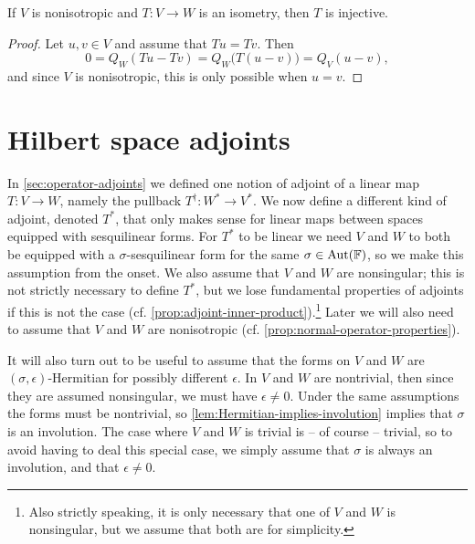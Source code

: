 \begin{lemma}
    \label{lem:isometry-injective}
    If $V$ is nonisotropic and $T \colon V \to W$ is an isometry, then $T$ is injective.
\end{lemma}

\begin{proof}
    Let $u,v \in V$ and assume that $Tu = Tv$. Then
    \begin{equation*}
        0
            = Q_W(Tu - Tv)
            = Q_W \bigl( T(u-v) \bigr)
            = Q_V(u-v),
    \end{equation*}
    and since $V$ is nonisotropic, this is only possible when $u = v$.
\end{proof}


\section{Hilbert space adjoints}

In \cref{sec:operator-adjoints} we defined one notion of adjoint of a linear map $T \colon V \to W$, namely the pullback $T^\dagger \colon W^* \to V^*$. We now define a different kind of adjoint, denoted $T^*$, that only makes sense for linear maps between spaces equipped with sesquilinear forms. For $T^*$ to be linear we need $V$ and $W$ to both be equipped with a $\sigma$-sesquilinear form for the same $\sigma \in \mathrm{Aut}(\mathbb{F})$, so we make this assumption from the onset. We also assume that $V$ and $W$ are nonsingular; this is not strictly necessary to define $T^*$, but we lose fundamental properties of adjoints if this is not the case (cf. \cref{prop:adjoint-inner-product}).\footnote{Also strictly speaking, it is only necessary that one of $V$ and $W$ is nonsingular, but we assume that both are for simplicity.} Later we will also need to assume that $V$ and $W$ are nonisotropic (cf. \cref{prop:normal-operator-properties}).

It will also turn out to be useful to assume that the forms on $V$ and $W$ are $(\sigma,\epsilon)$-Hermitian for possibly different $\epsilon$. In $V$ and $W$ are nontrivial, then since they are assumed nonsingular, we must have $\epsilon \neq 0$. Under the same assumptions the forms must be nontrivial, so \cref{lem:Hermitian-implies-involution} implies that $\sigma$ is an involution. The case where $V$ and $W$ is trivial is -- of course -- trivial, so to avoid having to deal this special case, we simply assume that $\sigma$ is always an involution, and that $\epsilon \neq 0$.

